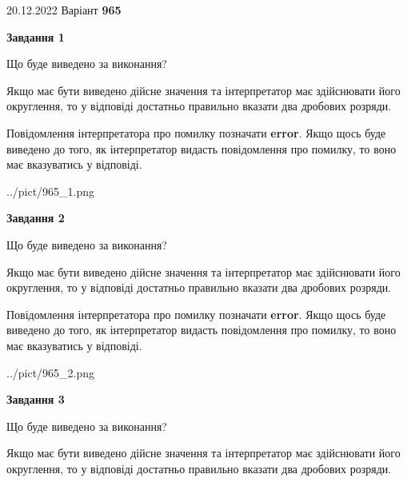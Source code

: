 \documentclass[12pt, ukrainian]{article}
\begin{document}
{20.12.2022 Варіант \No \textbf { 965 }\par}
{
\begin {Large}

{\begin {center}\textbf{Завдання 1}\end {center}}\par
Що буде виведено за виконання? \par

Якщо має бути виведено дійсне значення та інтерпретатор має здійснювати його округлення, 
то у відповіді достатньо правильно вказати два дробових розряди.

Повідомлення інтерпретатора про помилку позначати \textbf{error}.
Якщо щось буде виведено до того, як інтерпретатор видасть повідомлення про помилку, 
то воно має вказуватись у відповіді. \par

\begin{center}
	{../pict/965_1.png}
\end{center}
\newpage

{\begin {center}\textbf{Завдання 2}\end {center}}\par
Що буде виведено за виконання? \par

Якщо має бути виведено дійсне значення та інтерпретатор має здійснювати його округлення, 
то у відповіді достатньо правильно вказати два дробових розряди.

Повідомлення інтерпретатора про помилку позначати \textbf{error}.
Якщо щось буде виведено до того, як інтерпретатор видасть повідомлення про помилку, 
то воно має вказуватись у відповіді. \par

\begin{center}
	{../pict/965_2.png}
\end{center}
\newpage

{\begin {center}\textbf{Завдання 3}\end {center}}\par
Що буде виведено за виконання? \par

Якщо має бути виведено дійсне значення та інтерпретатор має здійснювати його округлення, 
то у відповіді достатньо правильно вказати два дробових розряди.


\end{Large}}
\end{document}
